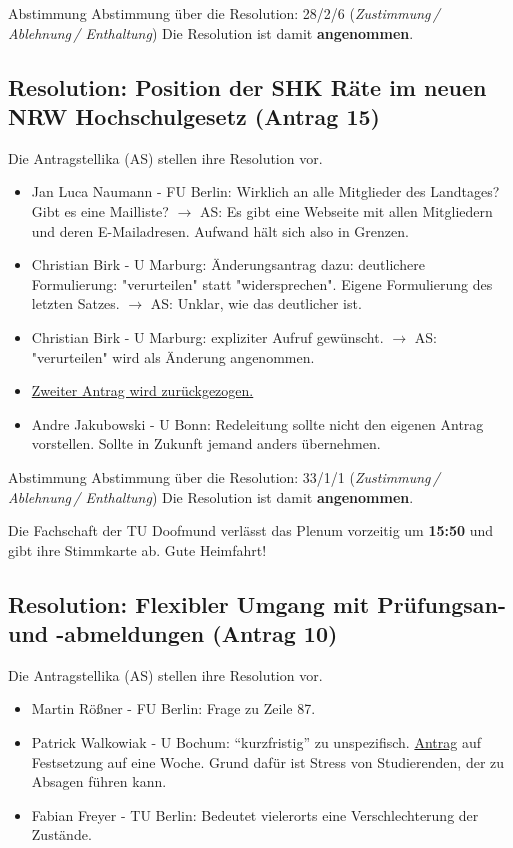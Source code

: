     \begin{success}{Abstimmung}
      Abstimmung über die Resolution: 28/2/6 (\textit{Zustimmung\,/ Ablehnung\,/ Enthaltung})
      Die Resolution ist damit \textbf{angenommen}.
    \end{success}

  \subsection*{Resolution: Position der SHK Räte im neuen NRW Hochschulgesetz (Antrag 15)}
    Die Antragstellika (AS) stellen ihre Resolution vor.
    \begin{itemize}
      \item Jan Luca Naumann - FU Berlin:  Wirklich an alle Mitglieder des Landtages? Gibt es eine Mailliste?
        $\rightarrow$ AS: Es gibt eine Webseite mit allen Mitgliedern und deren E-Mailadresen. Aufwand hält sich also in Grenzen.

      \item Christian Birk - U Marburg:  Änderungsantrag dazu: deutlichere Formulierung: "verurteilen" statt "widersprechen". Eigene Formulierung des letzten Satzes.
        $\rightarrow$ AS: Unklar, wie das deutlicher ist.
      \item Christian Birk - U Marburg:  expliziter Aufruf gewünscht.
        $\rightarrow$ AS: "verurteilen" wird als Änderung angenommen.
      \item \uline{Zweiter Antrag wird zurückgezogen.}
      \item Andre Jakubowski - U Bonn:  Redeleitung sollte nicht den eigenen Antrag vorstellen. Sollte in Zukunft jemand anders übernehmen.
    \end{itemize}

    \begin{success}{Abstimmung}
      Abstimmung über die Resolution: 33/1/1 (\textit{Zustimmung\,/ Ablehnung\,/ Enthaltung})
      Die Resolution ist damit \textbf{angenommen}.
    \end{success}

    \begin{info}{}
      Die Fachschaft der TU Doofmund verlässt das Plenum vorzeitig um \textbf{15:50} und gibt ihre Stimmkarte ab. Gute Heimfahrt!
    \end{info}

  \subsection*{Resolution: Flexibler Umgang mit Prüfungsan- und -abmeldungen (Antrag 10)}
    Die Antragstellika (AS) stellen ihre Resolution vor.
    \begin{itemize}
      \item Martin Rößner - FU Berlin:  Frage zu Zeile 87.
      \item Patrick Walkowiak - U Bochum:  ``kurzfristig'' zu unspezifisch. \uline{Antrag} auf Festsetzung auf eine Woche. Grund dafür ist Stress von Studierenden, der zu Absagen führen kann.
      \item Fabian Freyer - TU Berlin:  Bedeutet vielerorts eine Verschlechterung der Zustände.
    \end{itemize}

